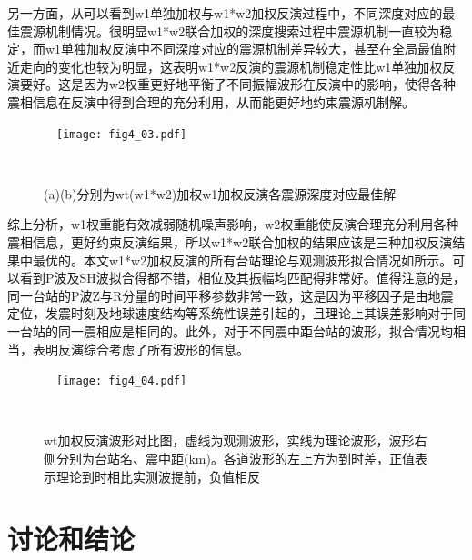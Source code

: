 另一方面，从可以看到w1单独加权与w1*w2加权反演过程中，不同深度对应的最佳震源机制情况。很明显w1*w2联合加权的深度搜索过程中震源机制一直较为稳定，而w1单独加权反演中不同深度对应的震源机制差异较大，甚至在全局最值附近走向的变化也较为明显，这表明w1*w2反演的震源机制稳定性比w1单独加权反演要好。这是因为w2权重更好地平衡了不同振幅波形在反演中的影响，使得各种震相信息在反演中得到合理的充分利用，从而能更好地约束震源机制解。
\begin{figure}
\centering
  \texttt{[image: fig4\_03.pdf]}
  \caption{ (a)(b)分别为wt(w1*w2)加权w1加权反演各震源深度对应最佳解}
  \label{fig4_03}
\end{figure}

综上分析，w1权重能有效减弱随机噪声影响，w2权重能使反演合理充分利用各种震相信息，更好约束反演结果，所以w1*w2联合加权的结果应该是三种加权反演结果中最优的。本文w1*w2加权反演的所有台站理论与观测波形拟合情况如所示。可以看到P波及SH波拟合得都不错，相位及其振幅均匹配得非常好。值得注意的是，同一台站的P波Z与R分量的时间平移参数非常一致，这是因为平移因子是由地震定位，发震时刻及地球速度结构等系统性误差引起的，且理论上其误差影响对于同一台站的同一震相应是相同的。此外，对于不同震中距台站的波形，拟合情况均相当，表明反演综合考虑了所有波形的信息。
\begin{figure}
\centering
  \texttt{[image: fig4\_04.pdf]}
  \caption{ wt加权反演波形对比图，虚线为观测波形，实线为理论波形，波形右侧分别为台站名、震中距(km)。各道波形的左上方为到时差，正值表示理论到时相比实测波提前，负值相反}
  \label{fig4_04}
\end{figure}

\section{讨论和结论}

